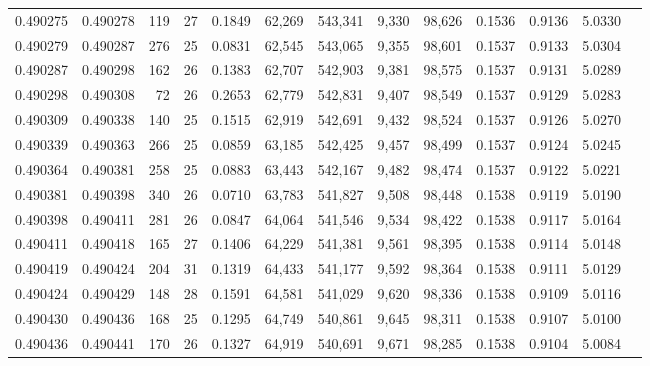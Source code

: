 \begin{tabular}{rrrrrrrrrrrrr}
0.490275 & 0.490278 & 119 &  27 &                                     0.1849 &  62,269 & 543,341 &   9,330 &  98,626 & 0.1536 & 0.9136 & 5.0330 \\
0.490279 & 0.490287 & 276 &  25 &                                     0.0831 &  62,545 & 543,065 &   9,355 &  98,601 & 0.1537 & 0.9133 & 5.0304 \\
0.490287 & 0.490298 & 162 &  26 &                                     0.1383 &  62,707 & 542,903 &   9,381 &  98,575 & 0.1537 & 0.9131 & 5.0289 \\
0.490298 & 0.490308 &  72 &  26 &                                     0.2653 &  62,779 & 542,831 &   9,407 &  98,549 & 0.1537 & 0.9129 & 5.0283 \\
0.490309 & 0.490338 & 140 &  25 &                                     0.1515 &  62,919 & 542,691 &   9,432 &  98,524 & 0.1537 & 0.9126 & 5.0270 \\
0.490339 & 0.490363 & 266 &  25 &                                     0.0859 &  63,185 & 542,425 &   9,457 &  98,499 & 0.1537 & 0.9124 & 5.0245 \\
0.490364 & 0.490381 & 258 &  25 &                                     0.0883 &  63,443 & 542,167 &   9,482 &  98,474 & 0.1537 & 0.9122 & 5.0221 \\
0.490381 & 0.490398 & 340 &  26 &                                     0.0710 &  63,783 & 541,827 &   9,508 &  98,448 & 0.1538 & 0.9119 & 5.0190 \\
0.490398 & 0.490411 & 281 &  26 &                                     0.0847 &  64,064 & 541,546 &   9,534 &  98,422 & 0.1538 & 0.9117 & 5.0164 \\
0.490411 & 0.490418 & 165 &  27 &                                     0.1406 &  64,229 & 541,381 &   9,561 &  98,395 & 0.1538 & 0.9114 & 5.0148 \\
0.490419 & 0.490424 & 204 &  31 &                                     0.1319 &  64,433 & 541,177 &   9,592 &  98,364 & 0.1538 & 0.9111 & 5.0129 \\
0.490424 & 0.490429 & 148 &  28 &                                     0.1591 &  64,581 & 541,029 &   9,620 &  98,336 & 0.1538 & 0.9109 & 5.0116 \\
0.490430 & 0.490436 & 168 &  25 &                                     0.1295 &  64,749 & 540,861 &   9,645 &  98,311 & 0.1538 & 0.9107 & 5.0100 \\
0.490436 & 0.490441 & 170 &  26 &                                     0.1327 &  64,919 & 540,691 &   9,671 &  98,285 & 0.1538 & 0.9104 & 5.0084 \\

\end{tabular}
